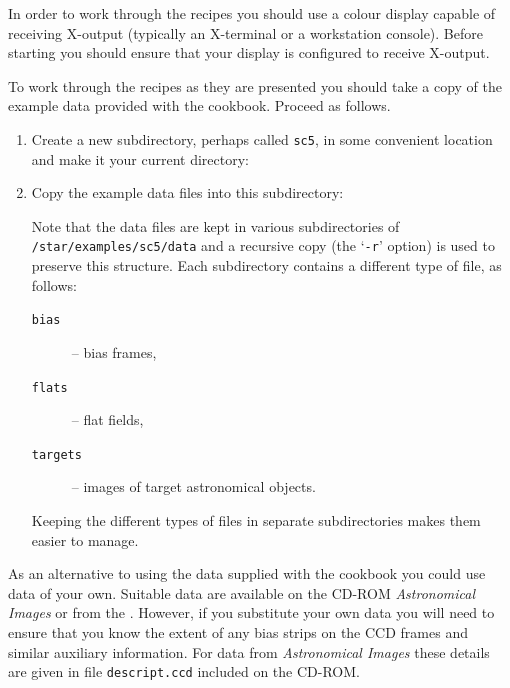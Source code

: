 \documentclass[twoside,11pt]{starlink}
\begin{document}
In order to work through the recipes you should use a colour display
capable of receiving X-output (typically an X-terminal or a workstation
console).  Before starting you should ensure that your display is configured
to receive X-output.

To work through the recipes as they are presented you should take a
copy of the example data provided with the cookbook.  Proceed as follows.

\begin{enumerate}

  \item Create a new subdirectory, perhaps called \texttt{sc5}, in some
   convenient location and make it your current directory:

\begin{terminalv}
\end{terminalv}

  \item Copy the example data files into this subdirectory:

\begin{terminalv}
\end{terminalv}

   Note that the data files are kept in various subdirectories of
   \texttt{/star/examples/sc5/data} and a recursive copy (the `\texttt{-r}'
   option) is used to preserve this structure.  Each subdirectory contains
   a different type of file, as follows:

  \begin{description}

    \item[\texttt{bias~~~}] -- bias frames,

    \item[\texttt{flats~~}] -- flat fields,

    \item[\texttt{targets}] -- images of target astronomical objects.

  \end{description}

   Keeping the different types of files in separate subdirectories makes
   them easier to manage.

\end{enumerate}

As an alternative to using the data supplied with the cookbook you could
use data of your own.  Suitable data are available on the CD-ROM \textit{Astronomical Images}\/\cite{JAFFE98} or from the
.
However, if you substitute your own data you will need to ensure that you
know the extent of any bias strips on the CCD frames and similar
auxiliary information.  For data from \textit{Astronomical Images}\/ these
details are given in file \texttt{descript.ccd} included on the CD-ROM.
\end{document}
